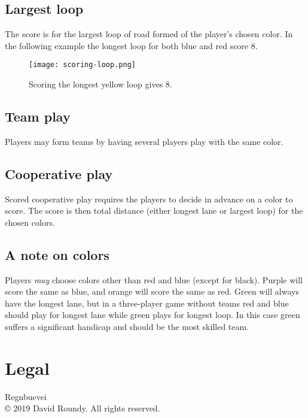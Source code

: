 \documentclass[twocolumn, 11pt]{article}
\begin{document}
\subsection*{Largest loop}
The score is for the largest loop of road formed of the player’s
chosen color.  In the following example the longest loop for both blue
and red score 8.

\begin{figure}[h]
  \texttt{[image: scoring-loop.png]}
  \caption{Scoring the longest yellow loop gives 8.}
\end{figure}

\subsection*{Team play}
Players may form teams by having several players play with the same
color.
\subsection*{Cooperative play}
Scored cooperative play requires the players to decide in advance on a
color to score.  The score is then total distance (either longest lane
or largest loop) for the chosen colors.

\subsection*{A note on colors}
Players \emph{may} choose colors other than red and blue (except for
black).  Purple will score the same as blue, and orange will score the
same as red.  Green will always have the longest lane, but in a
three-player game without teams red and blue should play for longest
lane while green plays for longest loop.  In this case green suffers a
significant handicap and should be the most skilled team.



\section*{Legal}
Regnbuevei\\ © 2019 David Roundy. All rights reserved.
\end{document}
